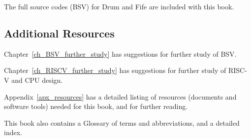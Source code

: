 The full source codes (BSV) for Drum and Fife are included with this
book.


\subsection{Additional Resources}

Chapter~\ref{ch_BSV_further_study} has suggestions for further study
of BSV.

Chapter~\ref{ch_RISCV_further_study} has suggestions for further study
of RISC-V and CPU design.

Appendix~\ref{apx_resources} has a detailed listing of resources
(documents and software tools) needed for this book, and for further
reading.

This book also contains a Glossary of terms and abbreviations, and a
detailed index.

